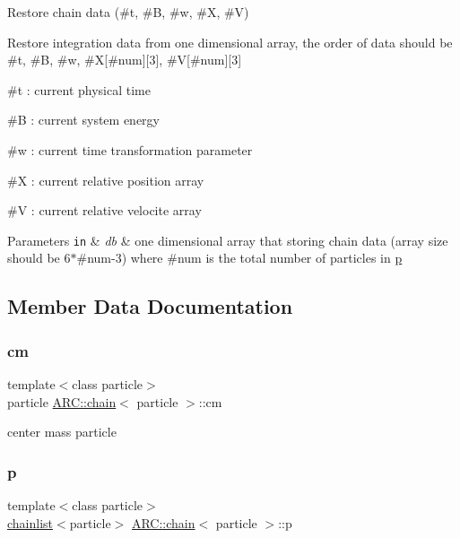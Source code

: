 Restore chain data (\#t, \#B, \#w, \#X, \#V) 

Restore integration data from one dimensional array, the order of data should be \#t, \#B, \#w, \#X\mbox{[}\#num\mbox{]}\mbox{[}3\mbox{]}, \#V\mbox{[}\#num\mbox{]}\mbox{[}3\mbox{]}
\begin{DoxyItemize}
\item \#t \+: current physical time
\item \#B \+: current system energy
\item \#w \+: current time transformation parameter
\item \#X \+: current relative position array
\item \#V \+: current relative velocite array 
\begin{DoxyParams}[1]{Parameters}
\mbox{\tt in}  & {\em db} & one dimensional array that storing chain data (array size should be 6$\ast$\#num-\/3) where \#num is the total number of particles in \hyperlink{classARC_1_1chain_af1793b656e139e1f87c2e0a55f87514b}{p} \\
\hline
\end{DoxyParams}

\end{DoxyItemize}

\subsection{Member Data Documentation}
\hypertarget{classARC_1_1chain_ae9f6a5cbf7aac2b33c7274e7e10916ed}{}\label{classARC_1_1chain_ae9f6a5cbf7aac2b33c7274e7e10916ed} 
\subsubsection{\texorpdfstring{cm}{cm}}
{\footnotesize\ttfamily template$<$class particle$>$ \\
particle \hyperlink{classARC_1_1chain}{A\+R\+C\+::chain}$<$ particle $>$\+::cm}



center mass particle 

\hypertarget{classARC_1_1chain_af1793b656e139e1f87c2e0a55f87514b}{}\label{classARC_1_1chain_af1793b656e139e1f87c2e0a55f87514b} 
\subsubsection{\texorpdfstring{p}{p}}
{\footnotesize\ttfamily template$<$class particle$>$ \\
\hyperlink{classARC_1_1chainlist}{chainlist}$<$particle$>$ \hyperlink{classARC_1_1chain}{A\+R\+C\+::chain}$<$ particle $>$\+::p}




